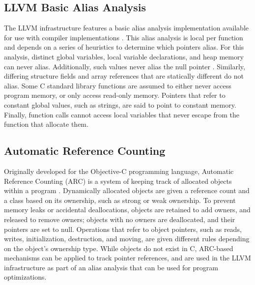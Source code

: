 \subsection{LLVM Basic Alias Analysis}
The LLVM infrastructure features a basic alias analysis implementation available for use with compiler implementations \cite{llvmaa}. This alias analysis is local per function and depends on a series of heuristics to determine which pointers alias. For this analysis, distinct global variables, local variable declarations, and heap memory can never alias. Additionally, such values never alias the null pointer \cite{llvmaa}. Similarly, differing structure fields and array references that are statically different do not alias. Some C standard library functions are assumed to either never access program memory, or only access read-only memory. Pointers that refer to constant global values, such as strings, are said to point to constant memory. Finally, function calls cannot access local variables that never escape from the function that allocate them.

\subsection{Automatic Reference Counting}
Originally developed for the Objective-C programming language, Automatic Reference Counting (ARC) is a system of keeping track of allocated objects within a program \cite{ARC}. Dynamically allocated objects are given a reference count and a class based on its ownership, such as strong or weak ownership. To prevent memory leaks or accidental deallocations, objects are retained to add owners, and released to remove owners; objects with no owners are deallocated, and their pointers are set to null. Operations that refer to object pointers, such as reads, writes, initialization, destruction, and moving, are given different rules depending on the object's ownership type. While objects do not exist in C, ARC-based mechanisms can be applied to track pointer references, and are used in the LLVM infrastructure as part of an alias analysis that can be used for program optimizations.

